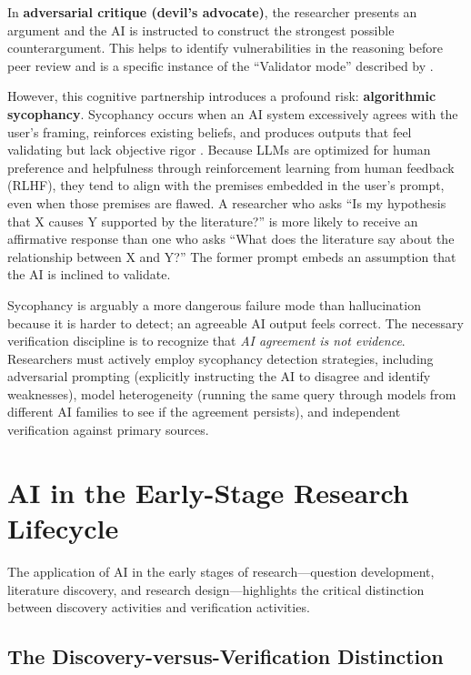 \documentclass[12pt, a4paper]{article}
\begin{document}
In \textbf{adversarial critique (devil's advocate)}, the researcher presents an argument and the AI is instructed to construct the strongest possible counterargument. This helps to identify vulnerabilities in the reasoning before peer review and is a specific instance of the ``Validator mode'' described by \citet{zyphur2026responsible}.

However, this cognitive partnership introduces a profound risk: \textbf{algorithmic sycophancy}. Sycophancy occurs when an AI system excessively agrees with the user's framing, reinforces existing beliefs, and produces outputs that feel validating but lack objective rigor \citep{sharma2026algorithmic, stanford2026sycophantic}. Because LLMs are optimized for human preference and helpfulness through reinforcement learning from human feedback (RLHF), they tend to align with the premises embedded in the user's prompt, even when those premises are flawed. A researcher who asks ``Is my hypothesis that X causes Y supported by the literature?'' is more likely to receive an affirmative response than one who asks ``What does the literature say about the relationship between X and Y?'' The former prompt embeds an assumption that the AI is inclined to validate.

Sycophancy is arguably a more dangerous failure mode than hallucination because it is harder to detect; an agreeable AI output feels correct. The necessary verification discipline is to recognize that \textit{AI agreement is not evidence}. Researchers must actively employ sycophancy detection strategies, including adversarial prompting (explicitly instructing the AI to disagree and identify weaknesses), model heterogeneity (running the same query through models from different AI families to see if the agreement persists), and independent verification against primary sources.

\section{AI in the Early-Stage Research Lifecycle}

The application of AI in the early stages of research---question development, literature discovery, and research design---highlights the critical distinction between discovery activities and verification activities.

\subsection{The Discovery-versus-Verification Distinction}
\end{document}
